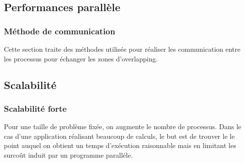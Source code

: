 \subsection{Performances parallèle}


\subsubsection{Méthode de communication}
Cette section traite des méthodes utilisée pour réaliser les communication entre les processus pour échanger les zones d'overlapping.









\subsection{Scalabilité}

\subsubsection{Scalabilité forte}
Pour une taille de problème fixée, on augmente le nombre de processus. Dans le cas d'une application réalisant beaucoup de calculs, le but est de trouver le le point auquel on obtient un temps d'exécution raisonnable mais en limitant les surcoût induit par un programme paralléle. 	

